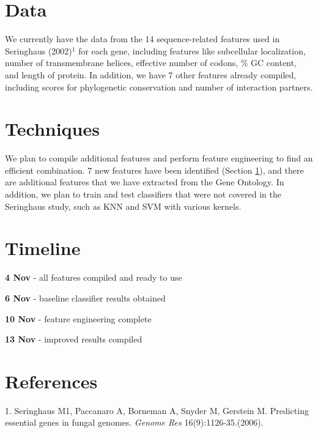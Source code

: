\documentclass{article}
\begin{document}
\section{Data} \label{Data}

We currently have the data from the 14 sequence-related features used in Seringhaus (2002)$^1$ for each gene, including features like subcellular localization, number of transmembrane helices, effective number of codons, \% GC content, and length of protein. In addition, we have 7 other features already compiled, including scores for phylogenetic conservation and number of interaction partners. 


\section{Techniques}
We plan to compile additional features and perform feature engineering to find an efficient combination. 7 new features have been identified (Section \ref{Data}), and there are additional features that we have extracted from the Gene Ontology.  In addition, we plan to train and test classifiers that were not covered in the Seringhaus study, such as KNN and SVM with various kernels.


\section{Timeline}
\begin{multicols}{2}

\noindent
\textbf{4 Nov} - all features compiled and ready to use

\noindent
\textbf{6 Nov} - baseline classifier results obtained

\noindent
\textbf{10 Nov} - feature engineering complete

\noindent
\textbf{13 Nov} - improved results compiled
\end{multicols}

\section{References}
1. Seringhaus M1, Paccanaro A, Borneman A, Snyder M, Gerstein M. Predicting essential genes in fungal genomes. \textit{Genome Res} 16(9):1126-35.(2006).
\end{document}
